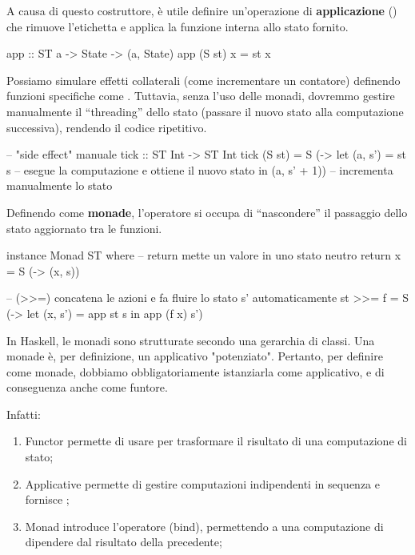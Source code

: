 A causa di questo costruttore, è utile definire un'operazione di \textbf{applicazione} () che rimuove l'etichetta  e applica la funzione interna allo stato fornito.

\begin{haskellbox}{}
app :: ST a -> State -> (a, State)
app (S st) x = st x
\end{haskellbox}

Possiamo simulare effetti collaterali (come incrementare un contatore) definendo funzioni specifiche come . Tuttavia, senza l'uso delle monadi, dovremmo gestire manualmente il ``threading'' dello stato (passare il nuovo stato  alla computazione successiva), rendendo il codice ripetitivo.

\begin{haskellbox}{}
-- "side effect" manuale
tick :: ST Int -> ST Int
tick (S st) = S (\s -> 
    let (a, s') = st s -- esegue la computazione e ottiene il nuovo stato
    in (a, s' + 1))    -- incrementa manualmente lo stato
\end{haskellbox}

Definendo  come \textbf{monade}, l'operatore \code{>>=} si occupa di ``nascondere'' il passaggio dello stato aggiornato tra le funzioni.

\begin{haskellbox}{}
instance Monad ST where
    -- return mette un valore in uno stato neutro
    return x = S (\s -> (x, s)) 

    -- (>>=) concatena le azioni e fa fluire lo stato s' automaticamente
    st >>= f = S (\s -> 
        let (x, s') = app st s 
        in app (f x) s') 
\end{haskellbox}

In Haskell, le monadi sono strutturate secondo una gerarchia di classi. Una monade è, per definizione, un applicativo "potenziato". Pertanto, per definire  come monade, dobbiamo obbligatoriamente istanziarla come applicativo, e di conseguenza anche come funtore.

Infatti:
\begin{enumerate}
    \item Functor permette di usare  per trasformare il risultato di una computazione di stato;
    \item Applicative permette di gestire computazioni indipendenti in sequenza e fornisce ;
    \item Monad introduce l'operatore \code{>>=} (bind), permettendo a una computazione di dipendere dal risultato della precedente;
\end{enumerate}

